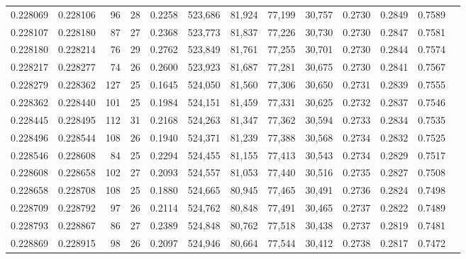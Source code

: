 \begin{tabular}{rrrrrrrrrrrrr}
0.228069 & 0.228106 &  96 &  28 &                                     0.2258 & 523,686 &  81,924 &  77,199 &  30,757 & 0.2730 & 0.2849 & 0.7589 \\
0.228107 & 0.228180 &  87 &  27 &                                     0.2368 & 523,773 &  81,837 &  77,226 &  30,730 & 0.2730 & 0.2847 & 0.7581 \\
0.228180 & 0.228214 &  76 &  29 &                                     0.2762 & 523,849 &  81,761 &  77,255 &  30,701 & 0.2730 & 0.2844 & 0.7574 \\
0.228217 & 0.228277 &  74 &  26 &                                     0.2600 & 523,923 &  81,687 &  77,281 &  30,675 & 0.2730 & 0.2841 & 0.7567 \\
0.228279 & 0.228362 & 127 &  25 &                                     0.1645 & 524,050 &  81,560 &  77,306 &  30,650 & 0.2731 & 0.2839 & 0.7555 \\
0.228362 & 0.228440 & 101 &  25 &                                     0.1984 & 524,151 &  81,459 &  77,331 &  30,625 & 0.2732 & 0.2837 & 0.7546 \\
0.228445 & 0.228495 & 112 &  31 &                                     0.2168 & 524,263 &  81,347 &  77,362 &  30,594 & 0.2733 & 0.2834 & 0.7535 \\
0.228496 & 0.228544 & 108 &  26 &                                     0.1940 & 524,371 &  81,239 &  77,388 &  30,568 & 0.2734 & 0.2832 & 0.7525 \\
0.228546 & 0.228608 &  84 &  25 &                                     0.2294 & 524,455 &  81,155 &  77,413 &  30,543 & 0.2734 & 0.2829 & 0.7517 \\
0.228608 & 0.228658 & 102 &  27 &                                     0.2093 & 524,557 &  81,053 &  77,440 &  30,516 & 0.2735 & 0.2827 & 0.7508 \\
0.228658 & 0.228708 & 108 &  25 &                                     0.1880 & 524,665 &  80,945 &  77,465 &  30,491 & 0.2736 & 0.2824 & 0.7498 \\
0.228709 & 0.228792 &  97 &  26 &                                     0.2114 & 524,762 &  80,848 &  77,491 &  30,465 & 0.2737 & 0.2822 & 0.7489 \\
0.228793 & 0.228867 &  86 &  27 &                                     0.2389 & 524,848 &  80,762 &  77,518 &  30,438 & 0.2737 & 0.2819 & 0.7481 \\
0.228869 & 0.228915 &  98 &  26 &                                     0.2097 & 524,946 &  80,664 &  77,544 &  30,412 & 0.2738 & 0.2817 & 0.7472 \\

\end{tabular}
